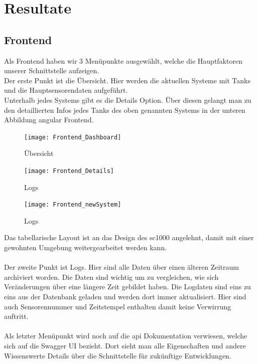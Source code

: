 \documentclass[../main.tex]{subfiles}
\begin{document}
	\section{Resultate}
	
	\subsection{Frontend}
	
	Als Frontend haben wir 3 Menüpunkte ausgewählt, welche die Hauptfaktoren unserer Schnittstelle aufzeigen. \\
	Der erste Punkt ist die Übersicht. Hier werden die aktuellen Systeme mit Tanks und die Hauptsensorendaten aufgeführt. \\
	Unterhalb jedes Systems gibt es die Details Option. Über diesen gelangt man zu den detaillierten Infos jedes Tanks des oben genannten Systems in der unteren Abbildung \gls{angular} Frontend. 
	\begin{figure}[H]
		\centering
		\texttt{[image: Frontend\_Dashboard]}
		\caption{Übersicht}
		\label{fig:Frontend_Dashboard}
	\end{figure}
	\begin{figure}[H]
		\centering
		\texttt{[image: Frontend\_Details]}
		\caption{Logs}
		\label{fig:Frontend_Details}
	\end{figure}	
	\begin{figure}[H]
		\centering
		\texttt{[image: Frontend\_newSystem]}
		\caption{Logs}
		\label{fig:Frontend_newSystem}
	\end{figure}
	\par
	\noindent	
	Das tabellarische Layout ist an das Design des \gls{sc1000} angelehnt, damit mit einer gewohnten Umgebung weitergearbeitet werden kann. 
	\\ \\
	Der zweite Punkt ist Logs. Hier sind alle Daten über einen älteren Zeitraum archiviert worden. Die Daten sind wichtig um zu vergleichen, wie sich Veränderungen über eine längere Zeit gebildet haben. Die Logdaten sind eins zu eins aus der Datenbank geladen und werden dort immer aktualisiert. Hier sind auch Sensorennummer und Zeitstempel enthalten damit keine Verwirrung auftritt.
	\\ \\
	Als letzter Menüpunkt wird noch auf die \gls{api} Dokumentation verwiesen, welche sich auf die Swagger UI bezieht. Dort sieht man alle Eigenschaften und andere Wissenswerte Details über die Schnittstelle für zukünftige Entwicklungen.\par 
\end{document}
